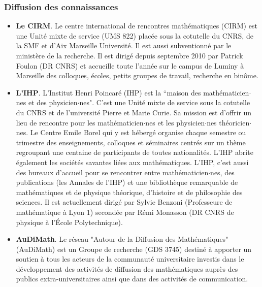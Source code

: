 
\subsubsection{Diffusion des connaissances}

\begin{itemize}
\item {\bf Le CIRM}.
Le centre international de rencontres math\'ematiques (CIRM) est une
Unit\'e mixte de service (UMS 822)  plac\'ee sous la cotutelle du CNRS, de la SMF et d'Aix Marseille Universit\'e. Il est aussi subventionn\'e par le minist\`ere de la recherche. Il est dirig\'e depuis septembre 2010
par Patrick Foulon (DR CNRS) et
accueille toute l'ann\'ee sur le campus de Luminy \`a Marseille des colloques, \'ecoles, petits groupes de travail,
recherche en bin\^ome. \\
\item{\bf L'IHP}.
L'Institut Henri Poincar\'e (IHP) est la ``maison des
math\'ematicien$\cdot$nes et des physicien$\cdot$nes". C'est une Unit\'e mixte de service sous la cotutelle 
du CNRS et  de l'universit\'e Pierre et Marie Curie. Sa mission est d'offrir un lieu de rencontre pour les math\'ematicien$\cdot$nes et les physicien$\cdot$nes th\'eoricien$\cdot$nes. Le Centre Emile Borel qui y est h\'eberg\'e organise chaque semestre ou trimestre des enseignements, colloques et s\'eminaires centr\'es sur un th\`eme regroupant une centaine de participants de toutes nationalit\'es. L'IHP abrite \'egalement les soci\'et\'es savantes li\'ees aux math\'ematiques.
L'IHP, c'est aussi des bureaux d'accueil pour se rencontrer entre math\'ematicien$\cdot$nes, des publications (les Annales de l'IHP)
et une biblioth\`eque remarquable de math\'ematiques et de physique th\'eorique, d'histoire et de philosophie des sciences. Il est actuellement dirig\'e par Sylvie Benzoni (Professeure de math\'ematique à Lyon 1) second\'ee par R\'emi Monasson (DR CNRS de physique à l'\'Ecole Polytechnique).
\\
\item{\bf AuDiMath}. Le r\'eseau "Autour de la Diffusion des Math\'ematiques" (AuDiMath) est un Groupe de recherche (GDS 3745)  destin\'e \`a apporter un soutien \`a tous les acteurs de la communaut\'e universitaire investis dans le d\'eveloppement des activit\'es de diffusion des math\'ematiques aupr\`es des publics extra-universitaires ainsi que dans des activit\'es de communication.\\
\end{itemize}

